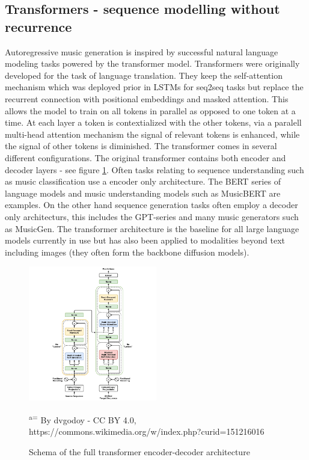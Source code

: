 \subsection{Transformers - sequence modelling without recurrence}
Autoregressive music generation is inspired by successful natural language modeling tasks powered by the transformer model. Transformers were originally developed for the task of language translation.\cite{Vaswani_Shazeer_Parmar_Uszkoreit_Jones_Gomez_Kaiser_Polosukhin_2017} They keep the self-attention mechanism which was deployed prior in LSTMs for seq2seq tasks \cite{Sutskever_Vinyals_Le_2014} but replace the recurrent connection with positional embeddings and masked attention. This allows the model to train on all tokens in parallel as opposed to one token at a time. At each layer a token is contextialized with the other tokens, via a paralell multi-head attention mechanism the signal of relevant tokens is enhanced, while the signal of other tokens is diminished. The transformer comes in several different configurations. The original transformer contains both encoder and decoder layers - see figure \ref{fig:transformer}. Often tasks relating to sequence understanding such as music classification use a encoder only architecture. The BERT series of language models \cite{Devlin_Chang_Lee_ToutanovaBERT_2019} and music understanding models such as MusicBERT\cite{Zeng_Tan_Wang_MUSICBERT_2021} are examples. On the other hand sequence generation tasks often employ a decoder only architecturs, this includes the GPT-series \cite{Radford_Wu_Child_Luan_gpt2_2019} and many music generators such as MusicGen\cite{copet2023simple}. The transformer architecture is the baseline for all large language models currently in use but has also been applied to modalities beyond text including images (they often form the backbone diffusion models).

\begin{figure}[H]
    \centering
    \includegraphics[width=0.5\textwidth]{IMAGES/Transformer,_full_architecture.png} 
    \caption{Schema of the full transformer encoder-decoder architecture}
    \small\textsuperscript{a=} By dvgodoy - CC BY 4.0, https://commons.wikimedia.org/w/index.php?curid=151216016
    \label{fig:transformer}
    
\end{figure}


